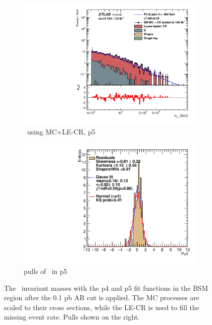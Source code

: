 \begin{figure}[ht]
\begin{subfigure}[h]{0.38\linewidth}
    \includegraphics[scale=0.3]{figs/ch6/fit/variable_nosmooth/p5/01PB/output_SMMCplusCR_Mjg_p5.pdf}%
     \caption{\mjph \ using MC+LE-CR, p5}
     \end{subfigure}
     \hfill
    \begin{subfigure}[h]{0.4\linewidth}
    \includegraphics[scale=0.32]{figs/ch6/fit/variable_nosmooth/p5/01PB/pull_SMMCplusCR_Mjg_p5.pdf}%
    \caption{pulls of \mjph \ in p5}
    \end{subfigure}
    \caption{The \mjph \ invariant masses with the p4 and p5 fit functions in the BSM region after the 0.1 pb AR cut is applied. The MC processes are scaled to their cross sections, while the LE-CR is used to fill the missing event rate. Pulls shown on the right.}
\label{fig:mjg-fit-pulls-01pb}
\end{figure}

